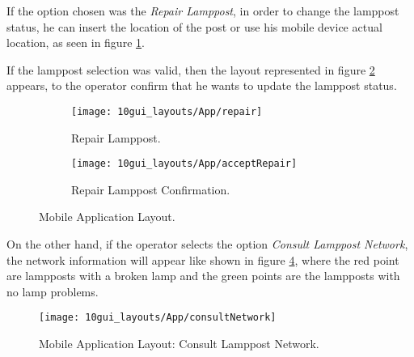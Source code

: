 \clearpage
If the option chosen was the \textit{Repair Lamppost}, in order to change the lamppost status, he can insert the location of the post or use his mobile device actual location, as seen in figure \ref{fig:repair}.


If the lamppost selection was valid, then the layout represented in figure \ref{fig:acceptRepair} appears, to the operator confirm that he wants to update the lamppost status.


\begin{figure}[H]
	\centering
	\begin{subfigure}{.5\textwidth}
		\centering
		\texttt{[image: 10gui\_layouts/App/repair]}
		\caption{Repair Lamppost.}
		\label{fig:repair}
	\end{subfigure}%
	\begin{subfigure}{.5\textwidth}
		\centering
		\texttt{[image: 10gui\_layouts/App/acceptRepair]}
		\caption{Repair Lamppost Confirmation.}
		\label{fig:acceptRepair}
	\end{subfigure}
	\caption{Mobile Application Layout.}
	\label{fig:App2}
\end{figure}

\clearpage
On the other hand, if the operator selects the option \textit{Consult Lamppost Network}, the network information will appear like shown in figure \ref{fig:consultNetwork}, where the red point are lampposts with a broken lamp and the green points are the lampposts with no lamp problems.

\begin{figure}[H]
	\centering	
	\texttt{[image: 10gui\_layouts/App/consultNetwork]}
	\caption{Mobile Application Layout: Consult Lamppost Network.}
	\label{fig:consultNetwork}
\end{figure}

\clearpage
{}

